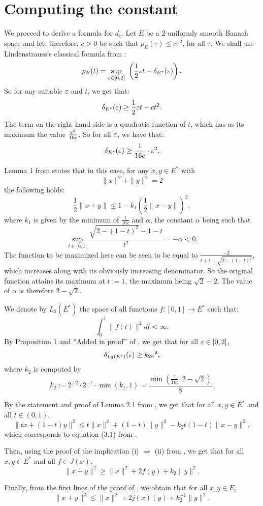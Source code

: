\documentclass{article}
\begin{document}
\section{Computing the constant}\label{sec:dc}

We proceed to derive a formula for $d_c$. Let $E$ be a $2$-uniformly smooth Banach space and let, therefore, $c>0$ be such that $\rho_E(\tau) \leq c \tau^2$, for all $\tau$. We shall use Lindenstrauss's classical formula from \cite{Lin63}:
$$\rho_E(t) = \sup_{\eps\in [0,2]}\ \left(\frac{1}{2}\eps t - \delta_{E^*}(\eps) \right).$$
So for any suitable $\varepsilon$ and $t$, we get that:
$$\delta_{E^*}(\varepsilon) \geq \frac{1}{2}\varepsilon t -ct^2.$$
The term on the right hand side is a quadratic function of $t$, which has as its maximum the value $\frac{\varepsilon^2}{16c}$. So for all $\varepsilon$, we have that:
$$\delta_{E^*}(\varepsilon) \geq \frac{1}{16c} \cdot \varepsilon^2.$$

Lemma 1 from \cite{Fig72} states that in this case, for any $x,y \in E^*$ with
$$\|x\|^2 + \|y\|^2 = 2$$
the following holds:
$$\frac{1}{2}\|x+y\| \leq 1- k_1 \left( \frac{1}{2} \|x-y\| \right)^2,$$
where $k_1$ is given by the minimum of $\frac{1}{16c}$ and $\alpha$, the constant $\alpha$ being such that
$$\sup_{t \in (0,1]} \frac{\sqrt{2-(1-t)^2}-1-t}{t^2}=-\alpha <0.$$
The function to be maximized here can be seen to be equal to $\frac{-2}{t+1+\sqrt{2-(1-t)^2}}$, which increases along with its obviously increasing denominator. So the original function attains its maximum at $t:=1$, the maximum being $\sqrt{2}-2$. The value of $\alpha$ is therefore $2-\sqrt{2}$.

We denote by $L_2(E^*)$ the space of all functions $f:[0,1]\to E^*$ such that:
$$\int_0^1 \|f(t)\|^2 dt < \infty.$$
By Proposition 1 and ``Added in proof'' of \cite{Fig72}, we get that for all $\varepsilon \in [0,2]$,
$$\delta_{L_2(E^*)}(\varepsilon) \geq k_2 \varepsilon^2,$$
where $k_2$ is computed by
$$k_2:= 2^{-2} \cdot 2^{-1} \cdot \min(k_1,1) = \frac{\min\left(\frac{1}{16c},2-\sqrt{2}\right)}{8}.$$

By the statement and proof of Lemma 2.1 from \cite{PruSma87}, we get that for all $x,y \in E^*$ and all $t \in (0,1)$,
$$\|tx+(1-t)y\|^2 \leq t\|x\|^2 + (1-t)\|y\|^2 - k_2t(1-t)\|x-y\|^2,$$
which corresponds to equation (3.1) from \cite{Xu91}.

Then, using the proof of the implication (i) $\Rightarrow$ (ii) from \cite[Corollary 1]{Xu91}, we get that for all $x,y \in E^*$ and all $f \in J(x)$,
$$\|x+y\|^2 \geq \|x\|^2 + 2f(y) + k_2\|y\|^2.$$

Finally, from the first lines of the proof of \cite[Theorem 1']{Xu91}, we obtain that for all $x,y \in E$,
$$\|x+y\|^2 \leq \|x\|^2 + 2j(x)(y) + k_2^{-1}\|y\|^2.$$
\end{document}
